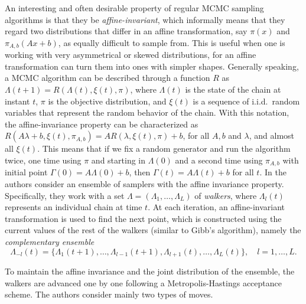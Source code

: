 An interesting and often desirable property of regular MCMC sampling algorithms is that they be \textit{affine-invariant}, which informally means that they regard two distributions that differ in an affine transformation, say \(\pi(x)\) and \(\pi_{A, b}(Ax + b)\), as equally difficult to sample from. This is useful when one is working with very asymmetrical or skewed distributions, for an affine transformation can turn them into ones with simpler shapes. Generally speaking, a MCMC algorithm can be described through a function \(R\) as \(\Lambda(t+1)=R(\Lambda(t), \xi(t), \pi)\), where \(\Lambda(t)\) is the state of the chain at instant \(t\), \(\pi\) is the objective distribution, and \(\xi(t)\) is a sequence of i.i.d.\ random variables that represent the random behavior of the chain. With this notation, the affine-invariance property can be characterized as \(R(A\lambda+b, \xi(t), \pi_{A,b}) = AR(\lambda, \xi(t), \pi) + b\), for all \(A,b\) and \(\lambda\), and almost all \(\xi(t)\). This means that if we fix a random generator and run the algorithm twice, one time using \(\pi\) and starting in \(\Lambda(0)\) and a second time using \(\pi_{A,b}\) with initial point \(\Gamma(0)=A\Lambda(0)+b\), then \(\Gamma(t)=A\Lambda(t)+b\) for all \(t\). In \citet{goodman2010ensemble} the authors consider an ensemble of samplers with the affine invariance property. Specifically, they work with a set \(\Lambda=(\Lambda_1, \dots, \Lambda_L)\) of \textit{walkers}, where \(\Lambda_l(t)\) represents an individual chain at time \(t\). At each iteration, an affine-invariant transformation is used to find the next point, which is constructed using the current values of the rest of the walkers (similar to Gibb's algorithm), namely the \textit{complementary ensemble}
\[
  \Lambda_{-l}(t) = \{\Lambda_1(t+1), \dots, \Lambda_{l-1}(t+1), \Lambda_{l+1}(t), \dots, \Lambda_L(t)\}, \quad l=1,\dots, L.
\]

To maintain the affine invariance and the joint distribution of the ensemble, the walkers are advanced one by one following a Metropolis-Hastings acceptance scheme. The authors consider mainly two types of moves.

